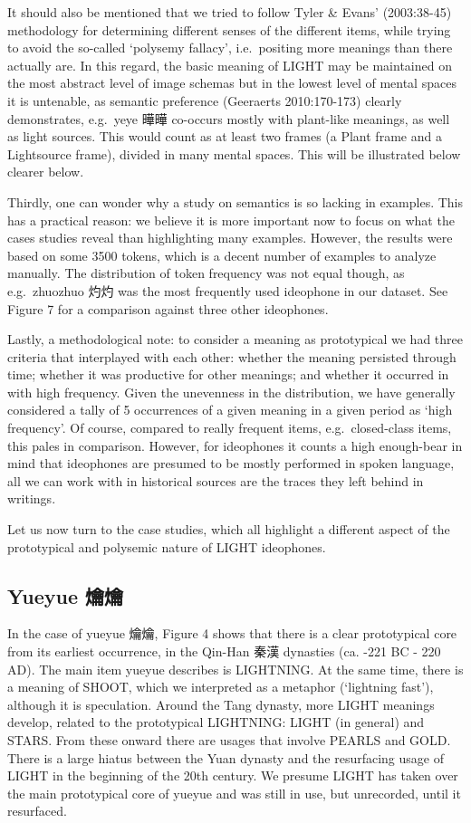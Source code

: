 \documentclass[12pt,article,oneside]{memoir}
\theoremstyle{definition}
\theoremstyle{definition}
\theoremstyle{definition}
\theoremstyle{remark}
\begin{document}
It should also be mentioned that we tried to follow Tyler \& Evans'
(2003:38-45) methodology for determining different senses of the
different items, while trying to avoid the so-called `polysemy fallacy',
i.e.~positing more meanings than there actually are. In this regard, the
basic meaning of LIGHT may be maintained on the most abstract level of
image schemas but in the lowest level of mental spaces it is untenable,
as semantic preference (Geeraerts 2010:170-173) clearly demonstrates,
e.g.~yeye 曄曄 co-occurs mostly with plant-like meanings, as well as
light sources. This would count as at least two frames (a Plant frame
and a Lightsource frame), divided in many mental spaces. This will be
illustrated below clearer below.

Thirdly, one can wonder why a study on semantics is so lacking in
examples. This has a practical reason: we believe it is more important
now to focus on what the cases studies reveal than highlighting many
examples. However, the results were based on some 3500 tokens, which is
a decent number of examples to analyze manually. The distribution of
token frequency was not equal though, as e.g.~zhuozhuo 灼灼 was the most
frequently used ideophone in our dataset. See Figure 7 for a comparison
against three other ideophones.

Lastly, a methodological note: to consider a meaning as prototypical we
had three criteria that interplayed with each other: whether the meaning
persisted through time; whether it was productive for other meanings;
and whether it occurred in with high frequency. Given the unevenness in
the distribution, we have generally considered a tally of 5 occurrences
of a given meaning in a given period as `high frequency'. Of course,
compared to really frequent items, e.g.~closed-class items, this pales
in comparison. However, for ideophones it counts a high enough-bear in
mind that ideophones are presumed to be mostly performed in spoken
language, all we can work with in historical sources are the traces they
left behind in writings.

Let us now turn to the case studies, which all highlight a different
aspect of the prototypical and polysemic nature of LIGHT ideophones.

\subsection{Yueyue 爚爚}\label{yueyue-}

In the case of yueyue 爚爚, Figure 4 shows that there is a clear
prototypical core from its earliest occurrence, in the Qin-Han 秦漢
dynasties (ca. -221 BC - 220 AD). The main item yueyue describes is
LIGHTNING. At the same time, there is a meaning of SHOOT, which we
interpreted as a metaphor (`lightning fast'), although it is
speculation. Around the Tang dynasty, more LIGHT meanings develop,
related to the prototypical LIGHTNING: LIGHT (in general) and STARS.
From these onward there are usages that involve PEARLS and GOLD. There
is a large hiatus between the Yuan dynasty and the resurfacing usage of
LIGHT in the beginning of the 20th century. We presume LIGHT has taken
over the main prototypical core of yueyue and was still in use, but
unrecorded, until it resurfaced.
\end{document}

